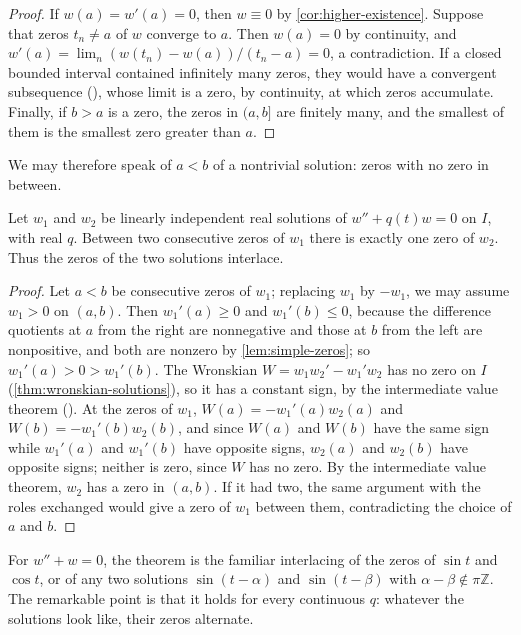 \begin{proof}
If $w(a)=w'(a)=0$, then $w\equiv0$ by \cref{cor:higher-existence}. Suppose that zeros $t_n\ne a$ of $w$ converge to $a$. Then $w(a)=0$ by continuity, and $w'(a)=\lim_n(w(t_n)-w(a))/(t_n-a)=0$, a contradiction. If a closed bounded interval contained infinitely many zeros, they would have a convergent subsequence (), whose limit is a zero, by continuity, at which zeros accumulate. Finally, if $b>a$ is a zero, the zeros in $(a,b]$ are finitely many, and the smallest of them is the smallest zero greater than $a$.
\end{proof}

We may therefore speak of  $a<b$ of a nontrivial solution: zeros with no zero in between.

\begin{theorem}
\label{thm:sturm-separation}
Let $w_1$ and $w_2$ be linearly independent real solutions of $w''+q(t)w=0$ on $I$, with real $q$. Between two consecutive zeros of $w_1$ there is exactly one zero of $w_2$. Thus the zeros of the two solutions interlace.
\end{theorem}

\begin{proof}
Let $a<b$ be consecutive zeros of $w_1$; replacing $w_1$ by $-w_1$, we may assume $w_1>0$ on $(a,b)$. Then $w_1'(a)\ge0$ and $w_1'(b)\le0$, because the difference quotients at $a$ from the right are nonnegative and those at $b$ from the left are nonpositive, and both are nonzero by \cref{lem:simple-zeros}; so $w_1'(a)>0>w_1'(b)$. The Wronskian $W=w_1w_2'-w_1'w_2$ has no zero on $I$ (\cref{thm:wronskian-solutions}), so it has a constant sign, by the intermediate value theorem (). At the zeros of $w_1$, $W(a)=-w_1'(a)w_2(a)$ and $W(b)=-w_1'(b)w_2(b)$, and since $W(a)$ and $W(b)$ have the same sign while $w_1'(a)$ and $w_1'(b)$ have opposite signs, $w_2(a)$ and $w_2(b)$ have opposite signs; neither is zero, since $W$ has no zero. By the intermediate value theorem, $w_2$ has a zero in $(a,b)$. If it had two, the same argument with the roles exchanged would give a zero of $w_1$ between them, contradicting the choice of $a$ and $b$.
\end{proof}

For $w''+w=0$, the theorem is the familiar interlacing of the zeros of $\sin t$ and $\cos t$, or of any two solutions $\sin(t-\alpha)$ and $\sin(t-\beta)$ with $\alpha-\beta\notin\pi\mathbb Z$. The remarkable point is that it holds for every continuous $q$: whatever the solutions look like, their zeros alternate.

